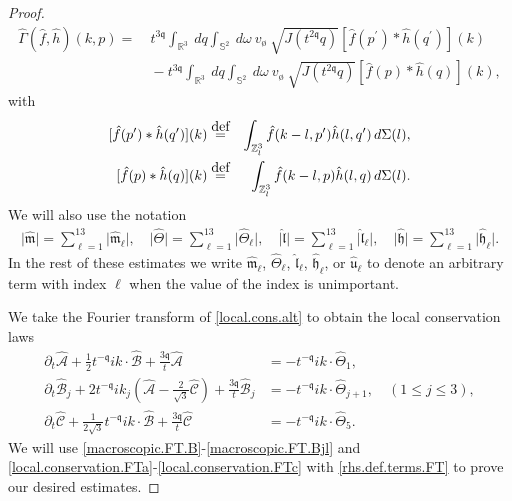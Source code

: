 \documentclass[10pt,a4paper]{amsart}
\newcommand{\Emptyset}{\text{\o}}
\newcommand{\Si}{\Sigma}
\newcommand{\Z}{\mathbb{Z}}
\newcommand{\eqdef }{\overset{\mbox{\tiny{def}}}{=}}
\newcommand{\highG}{\Theta}
\newcommand{\pv}{p}
\newcommand{\qq}{\mathfrak{q}}
\newcommand{\qv}{q}
\newcommand{\tmq}{t^{-\qq}}
\newcommand{\tqq}{t^{2\qq}}
\begin{document}
\begin{proof}
\begin{align}\label{def.GaF}
\widehat{\Gamma}(\hat{f},\hat{h})(k,\pv)
= &~
t^{3\qq}\int_{\mathbb{R}^3} ~  dq 
\int_{\mathbb{S}^{2}} ~ d\omega
~ v_{\Emptyset} ~  
 \sqrt{J(\tqq\qv)}
 [\hat{f}(p^{\prime})*\hat{h}(q^{\prime})](k)
 \\ \nonumber
 &~ -
 t^{3\qq}\int_{\mathbb{R}^3} ~  dq 
\int_{\mathbb{S}^{2}} ~ d\omega
~ v_{\Emptyset} ~  
 \sqrt{J(\tqq\qv)}
 [\hat{f}(p)*\hat{h}(q)](k),
\end{align}
with
\begin{eqnarray*}
{[\hat{f}(\pv^{\prime})*\hat{h}(\qv^{\prime})]}(k) & \eqdef &\int_{\Z^3_l} \hat{f}(k-l,\pv^{\prime})\hat{h}(l,\qv^{\prime})\,d\Si(l),\\
{[\hat{f}(\pv)*\hat{h}(\qv)]}(k)  & \eqdef &\int_{\Z^3_l}  \hat{f}(k-l,\pv)\hat{h}(l,\qv)\,d\Si(l).
\end{eqnarray*}
 We will also use the notation 
\begin{align}\label{index.sum.notation}
\big| \widehat{\mathfrak{m}} \big| = \sum_{\ell=1}^{13} \big| \widehat{\mathfrak{m}}_{\ell}\big|, \quad  
    \big| \widehat{\highG}\big| = \sum_{\ell=1}^{13} \big| \widehat{\highG}_{\ell}\big|, \quad 
    \big| \hat{\mathfrak{l}} \big| = \sum_{\ell=1}^{13} \big| \hat{\mathfrak{l}}_{\ell} \big|, 
    \quad 
    \big| \widehat{\mathfrak{h}} \big| = \sum_{\ell=1}^{13} \big| \widehat{\mathfrak{h}}_{\ell} \big|.
\end{align}
In the rest of these estimates we write $\widehat{\mathfrak{m}}_{\ell}$, $\widehat{\highG}_{\ell}$, $\hat{\mathfrak{l}}_{\ell}$, $\widehat{\mathfrak{h}}_{\ell}$, or $\hat{\mathfrak{u}}_{\ell}$ to denote an arbitrary term with index $\ell$ when the value of the index is unimportant. 

We take the Fourier transform of \eqref{local.cons.alt} to obtain the local conservation laws
\begin{align} \label{local.conservation.FTa}
\partial_t\widehat{\mathcal{A}}
     +
\frac{1}{2}  \tmq ik \cdot \widehat{\mathcal{B}}
+
\frac{3\qq }{t} \widehat{\mathcal{A}}
&=-\tmq ik \cdot \widehat{\highG}_{1},
\\  \label{local.conservation.FTb}
\partial_t\widehat{\mathcal{B}}_j
 +
2\tmq ik_j \left( \widehat{\mathcal{A}}
-\frac{2}{\sqrt{3}}
\widehat{\mathcal{C}}  \right)
+
\frac{3\qq }{t}\widehat{\mathcal{B}}_j
&=-\tmq ik \cdot \widehat{\highG}_{j+1}, \quad (1 \leq j \leq 3),
\\ \label{local.conservation.FTc}
\partial_t\widehat{\mathcal{C}}
  +
\frac{1}{2\sqrt{3}}  \tmq  ik \cdot \widehat{\mathcal{B}}
+
\frac{3\qq }{t} \widehat{\mathcal{C}}
&=-\tmq ik \cdot \widehat{\highG}_{5}.
\end{align}
We will use \eqref{macroscopic.FT.B}-\eqref{macroscopic.FT.Bjl} and \eqref{local.conservation.FTa}-\eqref{local.conservation.FTc} with \eqref{rhs.def.terms.FT} to prove our desired estimates.


\end{proof}
\end{document}
